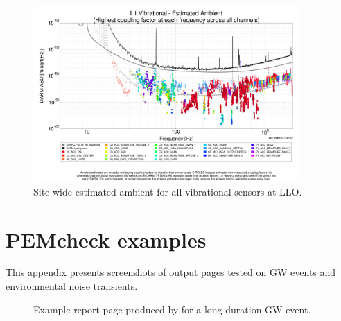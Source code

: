 \begin{figure}
  \centering
  \includegraphics[width=0.9\textwidth]{figures/appendix/pemcoupling-sitewide-ambient.png}
  \caption{Site-wide estimated ambient for all vibrational sensors at LLO.}
  \label{fig:pemcoupling-sitewide-ambient}
\end{figure}


\setcounter{figure}{0}
\setcounter{table}{0}

\chapter{PEMcheck examples}\label{app:pemcheck}

This appendix presents screenshots of  output pages tested on GW events and environmental noise transients.

\begin{figure}
  \centering
  \caption{Example report page produced by \protect{} for a long duration GW event.}
  \label{fig:pemcheck-GW190510g}
\end{figure}
